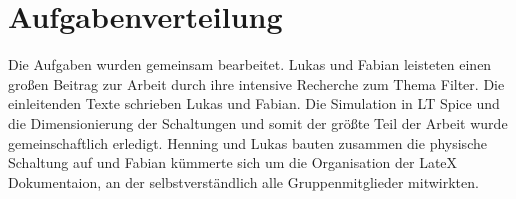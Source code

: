 \section{Aufgabenverteilung}

Die Aufgaben wurden gemeinsam bearbeitet. Lukas und Fabian leisteten einen großen Beitrag zur Arbeit durch ihre intensive Recherche zum Thema Filter. Die einleitenden Texte schrieben Lukas und Fabian. Die Simulation in LT Spice und die Dimensionierung der Schaltungen und somit der größte Teil der Arbeit wurde gemeinschaftlich erledigt. Henning und Lukas bauten zusammen die physische Schaltung auf und Fabian kümmerte sich um die Organisation der LateX Dokumentaion, an der selbstverständlich alle Gruppenmitglieder mitwirkten.